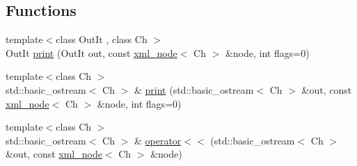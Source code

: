 \subsection*{Functions}
\begin{DoxyCompactItemize}
\item 
{\footnotesize template$<$class Out\+It , class Ch $>$ }\\Out\+It \hyperlink{namespacerapidxml_a0fb0be6eba49fb2e2646d5a72a0dc355}{print} (Out\+It out, const \hyperlink{singletonrapidxml_1_1xml__node}{xml\+\_\+node}$<$ Ch $>$ \&node, int flags=0)
\item 
{\footnotesize template$<$class Ch $>$ }\\std\+::basic\+\_\+ostream$<$ Ch $>$ \& \hyperlink{namespacerapidxml_a0d2e114d5dd85e13c23b8dab600720fe}{print} (std\+::basic\+\_\+ostream$<$ Ch $>$ \&out, const \hyperlink{singletonrapidxml_1_1xml__node}{xml\+\_\+node}$<$ Ch $>$ \&node, int flags=0)
\item 
{\footnotesize template$<$class Ch $>$ }\\std\+::basic\+\_\+ostream$<$ Ch $>$ \& \hyperlink{namespacerapidxml_a9ed8e626dd81348caede1f92a6c8418a}{operator$<$$<$} (std\+::basic\+\_\+ostream$<$ Ch $>$ \&out, const \hyperlink{singletonrapidxml_1_1xml__node}{xml\+\_\+node}$<$ Ch $>$ \&node)
\end{DoxyCompactItemize}

